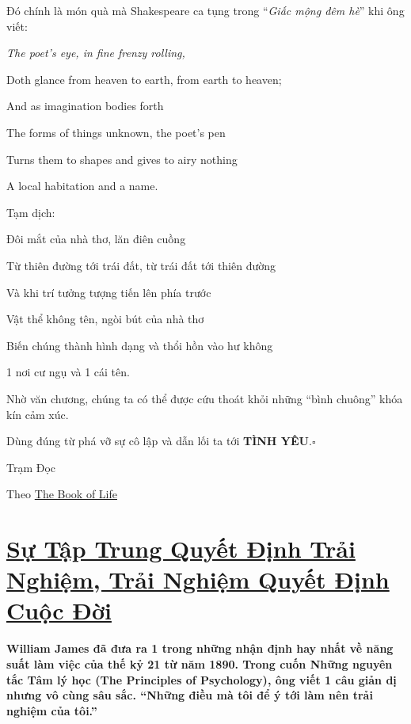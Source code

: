 \documentclass{book}
\numberwithin{equation}{section}
\begin{document}
%
Đó chính là món quà mà Shakespeare ca tụng trong ``\textit{Giấc mộng đêm hè}'' khi ông viết:
\begin{center}
    \it
    The poet's eye, in fine frenzy rolling,
    
    Doth glance from heaven to earth, from earth to heaven;
    
    And as imagination bodies forth
    
    The forms of things unknown, the poet's pen
    
    Turns them to shapes and gives to airy nothing
    
    A local habitation and a name.
\end{center}
Tạm dịch:
\begin{center}
    \it
    
    Đôi mắt của nhà thơ, lăn điên cuồng
    
    Từ thiên đường tới trái đất, từ trái đất tới thiên đường
    
    Và khi trí tưởng tượng tiến lên phía trước 
    
    Vật thể không tên, ngòi bút của nhà thơ
    
    Biến chúng thành hình dạng và thổi hồn vào hư không
    
    1 nơi cư ngụ và 1 cái tên.
\end{center}
Nhờ văn chương, chúng ta có thể được cứu thoát khỏi những ``bình chuông'' khóa kín cảm xúc.

Dùng đúng từ phá vỡ sự cô lập và dẫn lối ta tới \textbf{TÌNH YÊU}.\hfill$\square$

\begin{flushright}
    Trạm Đọc
    
    Theo \href{http://www.thebookoflife.org/how-words-help-us-to-feel-things/}{The Book of Life}
\end{flushright}


\chapter{\href{http://tramdoc.vn/tin-tuc/su-tap-trung-quyet-dinh-trai-nghiem-trai-nghiem-quyet-dinh-cuoc-doi-nMOYnW.html}{Sự Tập Trung Quyết Định Trải Nghiệm, Trải Nghiệm Quyết Định Cuộc Đời}}

\textbf{William James đã đưa ra 1 trong những nhận định hay nhất về năng suất làm việc của thế kỷ 21 từ năm 1890. Trong cuốn Những nguyên tắc Tâm lý học (The Principles of Psychology), ông viết 1 câu giản dị nhưng vô cùng sâu sắc. ``Những điều mà tôi để ý tới làm nên trải nghiệm của tôi.''}
\end{document}

